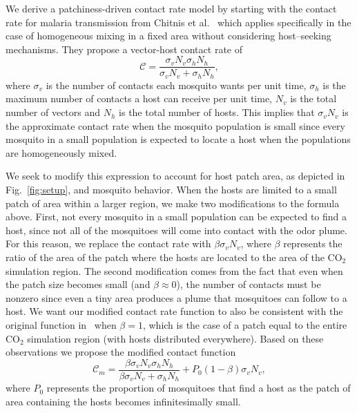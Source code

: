\documentclass[10pt]{article}
\begin{document}
We derive a patchiness-driven contact rate model by starting with the contact rate for malaria transmission from
Chitnis et al.~\cite{Chitnis2006} which applies specifically in the case of homogeneous mixing in a fixed area without considering host--seeking mechanisms.   They propose a vector-host contact rate of
\begin{equation*}
	\mathcal{C} = \frac{\sigma_v N_v\sigma_h N_h}{\sigma_v N_v + \sigma_h N_h},
\end{equation*}
where $\sigma_v$ is the number of contacts each mosquito wants per unit time, $\sigma_h$ is the maximum number of contacts a host can receive per unit time, $N_v$ is the total number of vectors and $N_h$ is the total number of hosts. This implies that $\sigma_v N_v$ is the approximate contact rate when the mosquito population is small since every mosquito in a small population is expected to locate a host when the populations are homogeneously mixed.

We seek to modify this expression to account for host patch area, as depicted in Fig.~\ref{fig:setup}, and mosquito behavior.  When the hosts are limited to a small patch of area within a larger region, we make two modifications to the formula above.  First, not every mosquito in a small population can be expected to find a host, since not all of the mosquitoes will come into contact with the odor plume.  For this reason, we replace the contact rate with $\beta\sigma_v N_v$, where $\beta$ represents the ratio of the area of the patch where the hosts are located to the area of the CO$_2$ simulation region.   The second modification comes from the fact that even when the patch size becomes small (and $\beta\approx0$), the number of contacts must be nonzero since even a tiny area produces a plume that mosquitoes can follow to a host. 
We want our modified contact rate function to also be consistent with the original function in~\cite{Chitnis2006} when
$\beta=1$, which is the case of a patch equal to the entire CO$_2$ simulation region (with hosts distributed everywhere). 
Based on these observations we propose the modified contact function
\begin{equation}
	\mathcal{C}_m 	= \frac{\beta\sigma_v N_v\sigma_h N_h}{\beta\sigma_v N_v + \sigma_h N_h} + P_0(1-\beta)\sigma_v N_v, \label{eqn:Cm}
\end{equation}
where $P_0$ represents the proportion of
mosquitoes that find a host as the patch of area containing the
hosts becomes infinitesimally small.
\end{document}

